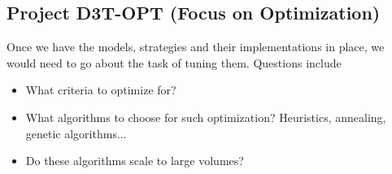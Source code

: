 \subsection*{Project D3T-OPT (Focus on Optimization)}
Once we have the models, strategies and their implementations in place, we would need to go about the task of tuning them.
Questions include
\begin{itemize}
\item What criteria to optimize for?
\item What algorithms to choose for such optimization? Heuristics, annealing, genetic algorithms...
\item Do these algorithms scale to large volumes?
\end{itemize}

